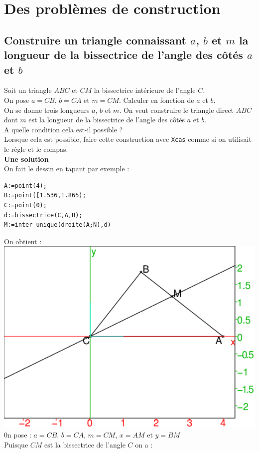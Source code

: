 \documentclass[a4paper,11pt]{book}
\begin{document}
\section{Des probl\`emes de construction}
\subsection{Construire un triangle connaissant $a$, $b$ et $m$ la longueur de la bissectrice de l'angle des c\^ot\'es $a$ et $b$}
Soit un triangle $ABC$ et $CM$ la bissectrice int\'erieure de l'angle $C$.\\
On pose $a=CB$, $b=CA$ et $m=CM$. Calculer en fonction de $a$ et $b$.\\
On se donne trois longueurs $a$, $b$ et $m$. On veut construire le triangle 
direct $ABC$ dont $m$ est la longueur de la bissectrice de l'angle des 
c\^ot\'es $a$ et $b$.\\
A quelle condition cela est-il possible ?\\
Lorsque cela est possible, faire cette construction avec {\tt Xcas} comme si on
 utilisait le r\`egle et le compas.\\
{\bf Une solution}\\
On fait le dessin en tapant par exemple :
\begin{verbatim}
A:=point(4);
B:=point([1.536,1.865);
C:=point(0);
d:=bissectrice(C,A,B);
M:=inter_unique(droite(A;N),d)
\end{verbatim}
On obtient :
\includegraphics[width=\textwidth]{bissect0}
0n pose : $a=CB$, $b=CA$, $m=CM$, $x=AM$ et $y=BM$\\
Puisque $CM$ est la bissectrice de l'angle $C$ on a :\\
\end{document}

